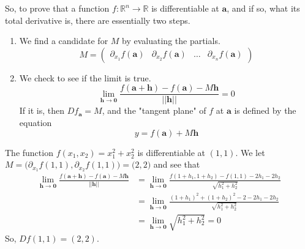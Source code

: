   \begin{figure}[H]
    \centering 
    \caption{} 
  \end{figure}


  So, to prove that a function $f: \mathbb{R}^n \longrightarrow \mathbb{R}$ is differentiable at $\mathbf{a}$, and if so, what its total derivative is, there are essentially two steps. 
  \begin{enumerate}
    \item We find a candidate for $M$ by evaluating the partials. 
    \[M = \begin{pmatrix} \partial_{x_1} f(\mathbf{a}) & \partial_{x_2} f(\mathbf{a}) & \ldots & \partial_{x_n} f(\mathbf{a}) \end{pmatrix}\]
    \item We check to see if the limit is true. 
    \[\lim_{\mathbf{h} \rightarrow \mathbf{0}} \frac{f(\mathbf{a} + \mathbf{h}) - f(\mathbf{a}) - M \mathbf{h}}{||\mathbf{h}||} = 0\]
    If it is, then $D f_\mathbf{a} = M$, and the "tangent plane" of $f$ at $\mathbf{a}$ is defined by the equation 
    \[y = f(\mathbf{a}) + M \mathbf{h}\]
  \end{enumerate}

  \begin{example}
    The function $f(x_1, x_2) = x_1^2 + x_2^2$ is differentiable at $(1, 1)$. We let $M = \big(\partial_{x_1} f(1, 1), \partial_{x_2} f(1, 1) \big) = \big(2, 2\big)$ and see that 
    \begin{align*}
      \lim_{\mathbf{h} \rightarrow \mathbf{0}} \frac{f(\mathbf{a} + \mathbf{h}) - f(\mathbf{a}) - M \mathbf{h}}{||\mathbf{h}||} & = \lim_{\mathbf{h} \rightarrow \mathbf{0}} \frac{f(1 + h_1, 1 + h_2) - f(1, 1) - 2 h_1 - 2 h_2}{\sqrt{h_1^2 + h_2^2}} \\
      & = \lim_{\mathbf{h} \rightarrow \mathbf{0}} \frac{(1 + h_1)^2 + (1 + h_2)^2 - 2 - 2 h_1 - 2 h_2}{\sqrt{h_1^2 + h_2^2}} \\
      & = \lim_{\mathbf{h} \rightarrow \mathbf{0}} \sqrt{h_1^2 + h_2^2} = 0
    \end{align*}
    So, $D f (1, 1) = (2, 2)$. 
  \end{example}

